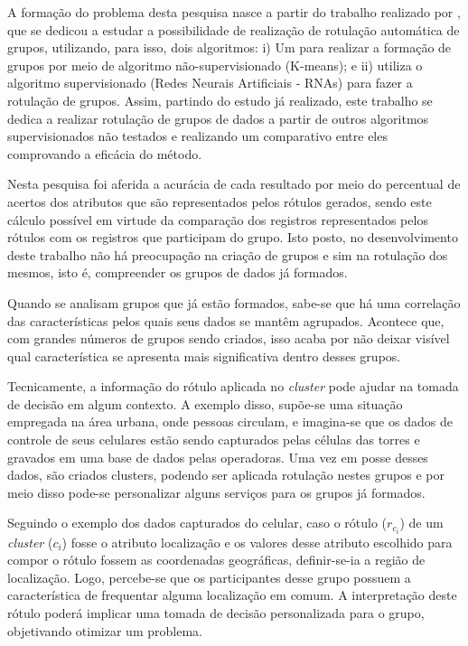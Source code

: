 A formação do problema desta pesquisa nasce a partir do trabalho realizado por , que se dedicou a estudar a possibilidade de realização de rotulação automática de grupos, utilizando, para isso, dois algoritmos: i) Um para realizar a formação de grupos por meio de algoritmo não-supervisionado (K-means); e ii) utiliza o algoritmo supervisionado (Redes Neurais Artificiais - RNAs) para fazer a rotulação de grupos. Assim, partindo do estudo já realizado, este trabalho se dedica a realizar rotulação de grupos de dados a partir de outros algoritmos supervisionados não testados e realizando um comparativo entre eles comprovando a eficácia do método. 

Nesta pesquisa foi aferida a acurácia de cada resultado por meio do percentual de acertos dos atributos que são representados pelos rótulos gerados, sendo este cálculo possível em virtude da comparação dos registros representados pelos rótulos com os registros que participam do grupo. Isto posto, no desenvolvimento deste trabalho não há preocupação na criação de grupos e sim na rotulação dos mesmos, isto é, compreender os grupos de dados já formados. 

Quando se analisam grupos que já estão formados, sabe-se que há uma correlação das características pelos quais seus dados se mantêm agrupados. Acontece que, com grandes números de grupos sendo criados, isso acaba por não deixar visível qual característica se apresenta mais significativa dentro desses grupos.


Tecnicamente, a informação do rótulo aplicada no \textit{cluster} pode ajudar na tomada de decisão em algum contexto. A exemplo disso, supõe-se uma situação empregada na área urbana, onde pessoas circulam, e imagina-se que os dados de controle de seus celulares estão sendo capturados pelas células das torres e gravados em uma base de dados pelas operadoras. Uma vez em posse desses dados, são criados clusters, podendo ser aplicada rotulação nestes grupos e por meio disso pode-se personalizar alguns serviços para os grupos já formados.

Seguindo o exemplo dos dados capturados do celular, caso o rótulo (${r_{c_i}}$) de um \textit{cluster} (${c_i}$) fosse o atributo localização e os valores desse atributo escolhido para compor o rótulo fossem as coordenadas geográficas, definir-se-ia a região de localização. Logo, percebe-se que os participantes desse grupo possuem a característica de frequentar alguma localização em comum. A interpretação deste rótulo poderá implicar uma tomada de decisão personalizada para o grupo, objetivando otimizar um problema. 

